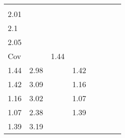 \documentclass[11pt]{article}
\begin{document}
\begin{longtable}[]{@{}llllllll@{}}
\begin{minipage}[t]{0.10\columnwidth}
\end{minipage} & \begin{minipage}[t]{0.10\columnwidth}\raggedright
\(\begin{array}{cc}2.0\\2.01\end{array}\)\strut
\end{minipage} & \begin{minipage}[t]{0.10\columnwidth}\raggedright
\(\begin{array}{cc}2.03\\2.1\end{array}\)\strut
\end{minipage} & \begin{minipage}[t]{0.10\columnwidth}\raggedright
\(\begin{array}{cc}2.02\\2.05\end{array}\)\strut
\end{minipage}\tabularnewline
\begin{minipage}[t]{0.10\columnwidth}\raggedright
Cov\strut
\end{minipage} & \begin{minipage}[t]{0.10\columnwidth}\raggedright
\(\begin{array}{cc}1.16 & 1.44\\1.44 & 2.98\end{array}\)\strut
\end{minipage} & \begin{minipage}[t]{0.10\columnwidth}\raggedright
\(\begin{array}{cc}1.13 & 1.42\\1.42 & 3.09\end{array}\)\strut
\end{minipage} & \begin{minipage}[t]{0.10\columnwidth}\raggedright
\(\begin{array}{cc}0.93 & 1.16\\1.16 & 3.02\end{array}\)\strut
\end{minipage} & \begin{minipage}[t]{0.10\columnwidth}\raggedright
\(\begin{array}{cc}0.88 & 1.07\\1.07 & 2.38\end{array}\)\strut
\end{minipage} & \begin{minipage}[t]{0.10\columnwidth}\raggedright
\(\begin{array}{cc}1.06 & 1.39\\1.39 & 3.19\end{array}\)\strut

\end{minipage}
\end{longtable}
\end{document}
